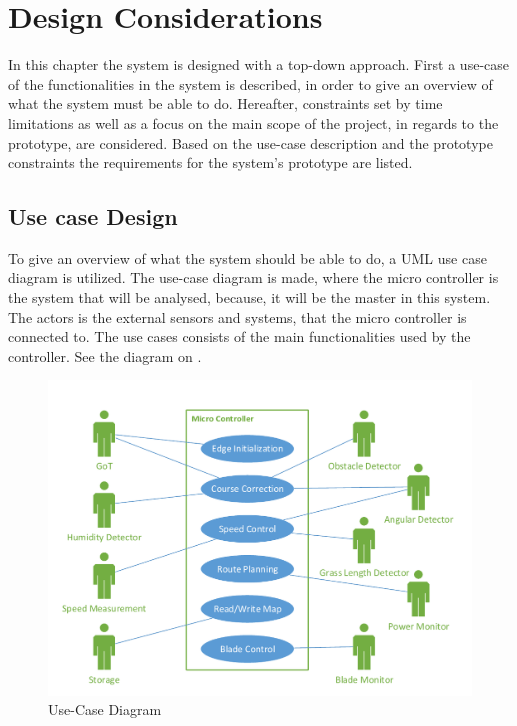 \chapter{Design Considerations}
\vspace{-5 mm}
In this chapter the system is designed with a top-down approach. First a use-case of the functionalities in the system is described, in order to give an overview of what the system must be able to do. Hereafter, constraints set by time limitations as well as a focus on the main scope of the project, in regards to the prototype, are considered. Based on the use-case description and the prototype constraints the requirements for the system's prototype are listed.
\vspace{-4 mm}
\section{Use case Design}
To give an overview of what the system should be able to do, a UML use case diagram is utilized. The use-case diagram is made, where the micro controller is the system that will be analysed, because, it will be the master in this system. The actors is the external sensors and systems, that the micro controller is connected to. The use cases consists of the main functionalities used by the controller. See the diagram on . 

\vspace{-3 mm}
 \begin{figure}[H]
	\centering
	\includegraphics[scale=0.8]{figures/P5UseCase.pdf}
	\caption{Use-Case Diagram}
	\label{fig:usecase}
\end{figure}

